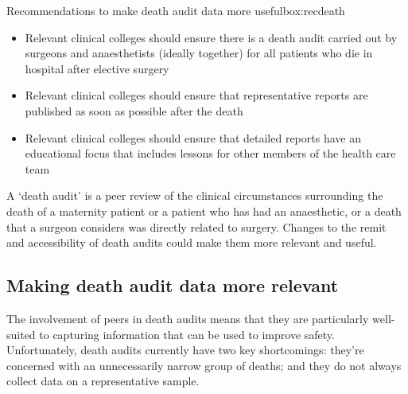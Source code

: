 \documentclass[FrontPage]{grattan}
\begin{document}
\begin{addsmallbox}{Recommendations to make death audit data more useful}{box:recdeath}
\begin{itemize}[leftmargin=*]
    \item Relevant clinical colleges should ensure there is a death audit carried out by surgeons and anaesthetists (ideally together) for all patients who die in hospital after elective surgery
    \item Relevant clinical colleges should ensure that representative reports are published as soon as possible after the death
    \item Relevant clinical colleges should ensure that detailed reports have an educational focus that includes lessons for other members of the health care team
\end{itemize}
\end{addsmallbox}

A ‘death audit’ is a peer review of the clinical circumstances surrounding the death of a maternity patient or a patient who has had an anaesthetic, or a death that a surgeon considers was directly related to surgery. Changes to the remit and accessibility of death audits could make them more relevant and useful.

\subsection{Making death audit data more relevant}\label{subsec:deathrelevant}
The involvement of peers in death audits means that they are particularly well-suited to capturing information that can be used to improve safety. Unfortunately, death audits currently have two key shortcomings: they’re concerned with an unnecessarily narrow group of deaths; and they do not always collect data on a representative sample.
\end{document}

